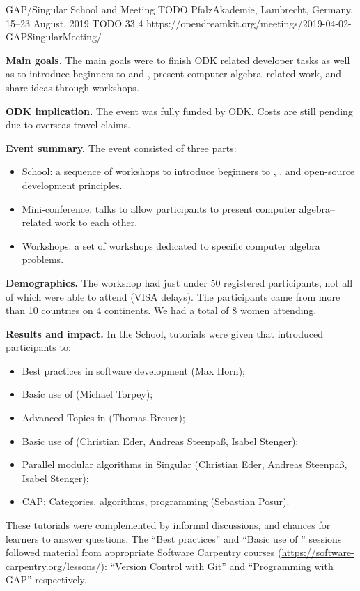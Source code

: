 \begin{event}
  {GAP/Singular School and Meeting}
  {TODO}  %
  {PfalzAkademie, Lambrecht, Germany, 15--23 August, 2019}
  {TODO}  %
  {33}
  {4}  %
  {https://opendreamkit.org/meetings/2019-04-02-GAPSingularMeeting/}

\textbf{Main goals.}
The main goals were to finish ODK related developer tasks as well as
  to introduce beginners to \GAP and \Singular, present
computer algebra--related work, and share ideas through workshops.

\textbf{ODK implication.}
The event was fully funded by ODK. Costs are still pending due to
overseas travel claims.

\textbf{Event summary.}
The event consisted of three parts:
\begin{itemize}
\item School: a sequence of workshops to introduce beginners to \GAP, \Singular,
  and open-source development principles.
\item Mini-conference: talks to allow participants to present computer
  algebra--related work to each other.
\item Workshops: a set of workshops dedicated to specific computer algebra
  problems.
\end{itemize}

\textbf{Demographics.}
The workshop had just under 50 registered participants, not all of which
  were able to attend (VISA delays).
The participants came from more than 10 countries on 4 continents.
We had a total of 8 women attending.

\textbf{Results and impact.}
In the School, tutorials were given that introduced participants to:
\begin{itemize}
\item Best practices in software development (Max Horn);
\item Basic use of \GAP (Michael Torpey);
\item Advanced Topics in \GAP (Thomas Breuer);
\item Basic use of \Singular (Christian Eder, Andreas Steenpaß, Isabel Stenger);
\item Parallel modular algorithms in Singular (Christian Eder, Andreas Steenpaß, Isabel Stenger);
\item CAP: Categories, algorithms, programming (Sebastian Posur).
\end{itemize}
These tutorials were complemented by informal discussions, and chances for
learners to answer questions.  The ``Best practices'' and ``Basic use of \GAP''
sessions followed material from appropriate Software Carpentry courses
(\url{https://software-carpentry.org/lessons/}): ``Version Control with Git''
and ``Programming with GAP'' respectively.


\end{event}
